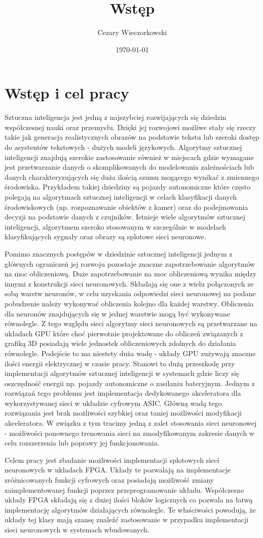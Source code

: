\documentclass[../main.tex]{subfiles}
\author{Cezary Wieczorkowski}
\date{\today}
\title{Wstęp}
\begin{document}
\section{Wstęp i cel pracy}
Sztuczna inteligencja jest jedną z najszybciej rozwijających się dziedzin współczesnej nauki oraz przemysłu. Dzięki jej rozwojowi możliwe stały się rzeczy takie jak generacja realistycznych obrazów na podstawie tekstu lub 
szeroki dostęp do asystentów tekstowych - dużych modeli językowych. Algorytmy sztucznej inteligencji znajdują szerokie zastosowanie również w miejscach gdzie wymagane jest przetwarzanie danych o skomplikowanych do modelowania
zależnościach lub danych charakteryzujących się duża ilością szumu mogącego wynikać z zmiennego środowiska. Przykładem takiej dziedziny są pojazdy autonomiczne które często polegają na algorytmach sztucznej inteligencji 
w celach klasyfikacji danych środowiskowych (np. rozpoznawanie obiektów z kamer) oraz do podejmowania decyzji na podstawie danych z czujników. Istnieje wiele algorytmów sztucznej inteligencji, algorytmem szeroko stosowanym 
w szczególnie w modelach klasyfikujących sygnały oraz obrazy są splotowe sieci neuronowe. 
\par
Pomimo znacznych postępów w dziedzinie sztucznej inteligencji jednym z głównych ograniczeń jej rozwoju pozostaje znaczne zapotrzebowanie 
algorytmów na moc obliczeniową. Duże zapotrzebowanie na moc obliczeniową wynika między innymi z konstrukcji sieci neuronowych. Składają się one z wielu połączonych ze sobą warstw neuronów, w celu uzyskania odpowiedzi sieci neuronowej
na podane pobudzenie należy wykonywać obliczenia kolejno dla każdej warstwy. Obliczenia dla neuronów znajdujących się w jednej warstwie mogą być wykonywane równolegle. Z tego względu sieci algorytmy sieci neuronowych są 
przetwarzane na układach GPU które choć pierwotnie projektowane do obliczeń związanych z grafiką 3D posiadają wiele jednostek obliczeniowych zdolnych do działania równolegle. Podejście to ma niestety duża wadę - układy GPU zużywają
znaczne ilości energii elektrycznej w czasie pracy. Stanowi to dużą przeszkodę przy implementacji algorytmów sztucznej inteligencji w systemach gdzie liczy się oszczędność energii np. pojazdy autonomiczne o zasilaniu bateryjnym.
Jednym z rozwiązań tego problemu jest implementacja dedykowanego akceleratora dla wykorzystywanej sieci w układzie cyfrowym ASIC. Główną wadą tego rozwiązania jest brak możliwości szybkiej oraz taniej możliwości modyfikacji akceleratora.
W związku z tym tracimy jedną z zalet stosowania sieci neuronowej - możliwości ponownego trenowania sieci na zmodyfikowanym zakresie danych w celu rozszerzenia lub poprawy jej funkcjonowania. 
\par
Celem pracy jest zbadanie możliwości implementacji splotowych sieci neuronowych w układach FPGA. Układy te pozwalają na implementacje zróżnicowanych funkcji cyfrowych oraz posiadają możliwość zmiany zaimplementowanej funkcji poprzez
przeprogramowanie układu. Współczesne układy FPGA składają się z dużej ilości bloków logicznych co pozwala na łatwą implementację algorytmów działających równolegle. Te właściwości powodują, że układy tej klasy mają szansę znaleźć
zastosowanie w przypadku implementacji sieci neuronowych w systemach wbudowanych.
\end{document}
